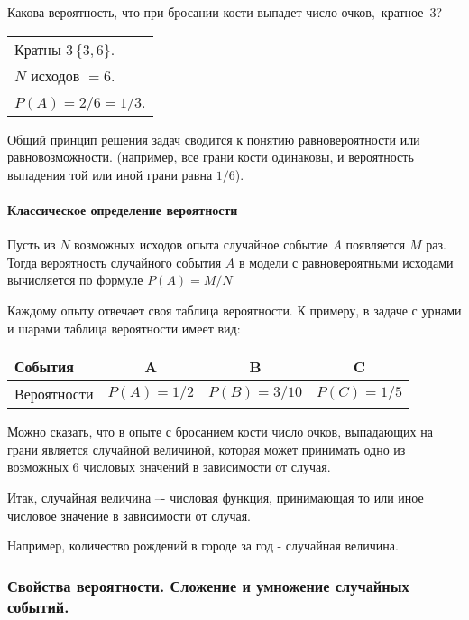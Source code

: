 ﻿\documentclass[a4paper,12pt]{report}
\begin{document}
	 Какова вероятность, что при бросании кости выпадет число очков,~кратное~3?

	\strut


	\begin{tabular}{l}

	Кратны $3\,\{3,6\}$.\\ 

	$N$ исходов $ = 6$.\\

	$P(A) = 2/6 = 1/3$.\\

	\end{tabular}


	\sstrut Общий принцип решения задач сводится к понятию равновероятности или равновозможности. (например, все грани кости одинаковы, и вероятность выпадения той или иной грани равна $1/6$).



\paragraph{Классическое определение вероятности}

	Пусть из $N$ возможных исходов опыта случайное событие $A$ появляется $M$ раз. Тогда вероятность случайного события $A$ в модели с равновероятными исходами вычисляется по формуле $P(A) = M/N$ 

	Каждому опыту отвечает своя таблица вероятности. К примеру, в задаче с урнами и шарами таблица вероятности имеет вид: \strut


	\begin{tabular}{|l|c|c|c|}
	\hline
		События & A & B & C\\
	\hline	
		Вероятности & $P(A) = 1/2$ & $P(B) = 3/10$ & $P(C) = 1/5$\\
	\hline
	\end{tabular}


	\strut Можно сказать, что в опыте с бросанием кости число очков, выпадающих на грани является случайной величиной, которая может принимать одно из возможных 6 числовых значений в зависимости от случая.

	Итак, случайная величина –- числовая функция, принимающая то или иное числовое значение в зависимости от случая.

	Например, количество рождений в городе за год - случайная величина.





\subsubsection{Свойства вероятности. Сложение и умножение случайных событий.}
\end{document}
